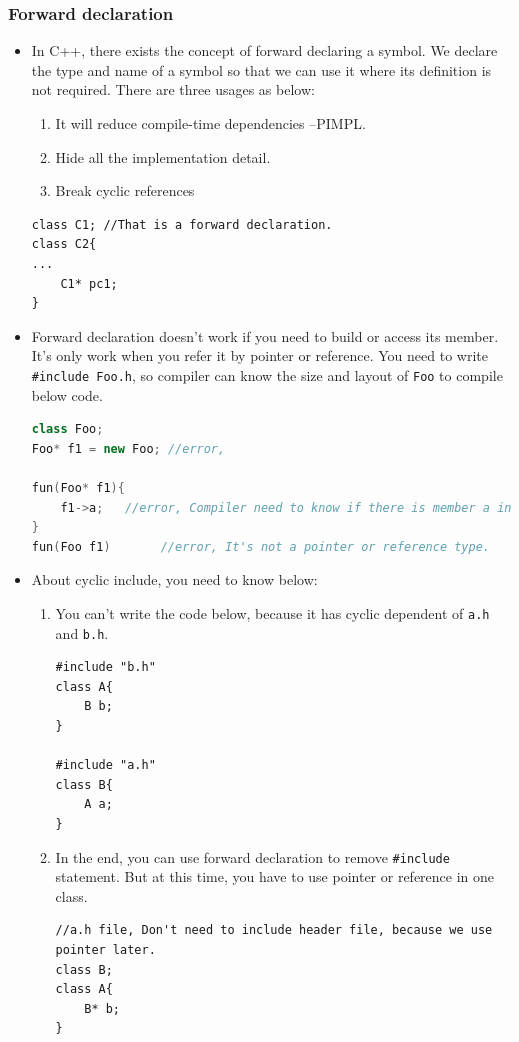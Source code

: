 \documentclass[a4paper,11pt,twoside]{book}
\begin{document}
\subsubsection{Forward declaration}
\begin{itemize}
	\item In C++, there exists the concept of forward declaring a symbol. We declare the type and name of a symbol so that we can use it where its definition is not required. There are three usages as below:
	\begin{enumerate}
		\item It will reduce compile-time dependencies --PIMPL.
		\item Hide all the implementation detail. 
		\item Break cyclic references
	\end{enumerate}
	
\begin{lstlisting}[numbers=none]
class C1; //That is a forward declaration.
class C2{
...
	C1* pc1;
}
\end{lstlisting}
	
	\item Forward declaration doesn't work if you need to build or access its member. It's only work when you refer it by pointer or reference. You need to write \texttt{\#include Foo.h}, so compiler can know the size and layout of \texttt{Foo} to compile below code.
\begin{lstlisting}[frame=single, language=c++]
class Foo; 
Foo* f1 = new Foo; //error,
	
fun(Foo* f1){
	f1->a;   //error, Compiler need to know if there is member a inside of Foo
}
fun(Foo f1)       //error, It's not a pointer or reference type.
\end{lstlisting}
	
	\item About cyclic include, you need to know below:
	\begin{enumerate}
		\item You can't write the code below, because it has cyclic dependent of \texttt{a.h} and \texttt{b.h}.
\begin{lstlisting}[numbers=none]
#include "b.h"
class A{
	B b;
}

#include "a.h"
class B{
	A a;
}
\end{lstlisting}

		\item In the end, you can use forward declaration to remove \texttt{\#include} statement. But at this time, you have to use pointer or reference in one class.
\begin{lstlisting}[numbers=none]
//a.h file, Don't need to include header file, because we use pointer later.  
class B; 
class A{
	B* b;
}
\end{lstlisting}
	\end{enumerate}
	

\end{itemize}
\end{document}
